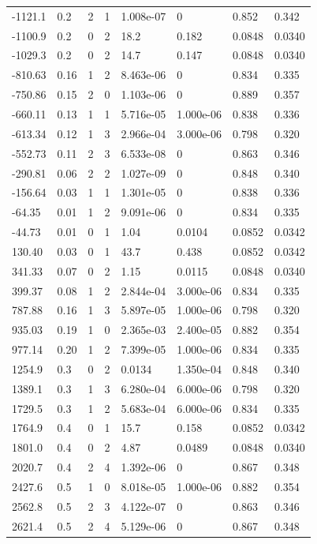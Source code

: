 \documentclass[preview]{standalone}
\begin{document}
{{\begin{tabular}{L{1.2cm}C{1.2cm} C{0.3cm}C{0.5cm} C{1.4cm}C{1.4cm} C{1.4cm}C{1.4cm}}
  -1121.1  &   0.2  & 2     &  1 &  1.008e-07  & 0  & 0.852 &  0.342   \\ 
  -1100.9  &   0.2  & 0     &  2 &  18.2  & 0.182  & 0.0848 &  0.0340   \\ 
  -1029.3  &   0.2  & 0     &  2 &  14.7  & 0.147  & 0.0848 &  0.0340   \\ 
  -810.63  &  0.16  & 1     &  2 &  8.463e-06  & 0  & 0.834 &  0.335   \\ 
  -750.86  &  0.15  & 2     &  0 &  1.103e-06  & 0  & 0.889 &  0.357   \\ 
  -660.11  &  0.13  & 1     &  1 &  5.716e-05  & 1.000e-06  & 0.838 &  0.336   \\ 
  -613.34  &  0.12  & 1     &  3 &  2.966e-04  & 3.000e-06  & 0.798 &  0.320   \\ 
  -552.73  &  0.11  & 2     &  3 &  6.533e-08  & 0  & 0.863 &  0.346   \\ 
  -290.81  &  0.06  & 2     &  2 &  1.027e-09  & 0  & 0.848 &  0.340   \\ 
  -156.64  &  0.03  & 1     &  1 &  1.301e-05  & 0  & 0.838 &  0.336   \\ 
  -64.35  &  0.01  & 1     &  2 &  9.091e-06  & 0  & 0.834 &  0.335   \\ 
  -44.73  &  0.01  & 0     &  1 &  1.04  & 0.0104  & 0.0852 &  0.0342   \\ 
  130.40  &  0.03  & 0     &  1 &  43.7  & 0.438  & 0.0852 &  0.0342   \\ 
  341.33  &  0.07  & 0     &  2 &  1.15  & 0.0115  & 0.0848 &  0.0340   \\ 
  399.37  &  0.08  & 1     &  2 &  2.844e-04  & 3.000e-06  & 0.834 &  0.335   \\ 
  787.88  &  0.16  & 1     &  3 &  5.897e-05  & 1.000e-06  & 0.798 &  0.320   \\ 
  935.03  &  0.19  & 1     &  0 &  2.365e-03  & 2.400e-05  & 0.882 &  0.354   \\ 
  977.14  &  0.20  & 1     &  2 &  7.399e-05  & 1.000e-06  & 0.834 &  0.335   \\ 
  1254.9  &   0.3  & 0     &  2 &  0.0134  & 1.350e-04  & 0.848 &  0.340   \\ 
  1389.1  &   0.3  & 1     &  3 &  6.280e-04  & 6.000e-06  & 0.798 &  0.320   \\ 
  1729.5  &   0.3  & 1     &  2 &  5.683e-04  & 6.000e-06  & 0.834 &  0.335   \\ 
  1764.9  &   0.4  & 0     &  1 &  15.7  & 0.158  & 0.0852 &  0.0342   \\ 
  1801.0  &   0.4  & 0     &  2 &  4.87  & 0.0489  & 0.0848 &  0.0340   \\ 
  2020.7  &   0.4  & 2     &  4 &  1.392e-06  & 0  & 0.867 &  0.348   \\ 
  2427.6  &   0.5  & 1     &  0 &  8.018e-05  & 1.000e-06  & 0.882 &  0.354   \\ 
  2562.8  &   0.5  & 2     &  3 &  4.122e-07  & 0  & 0.863 &  0.346   \\ 
  2621.4  &   0.5  & 2     &  4 &  5.129e-06  & 0  & 0.867 &  0.348   \\ 
\hline 
\end{tabular} 

}}
\end{document}
